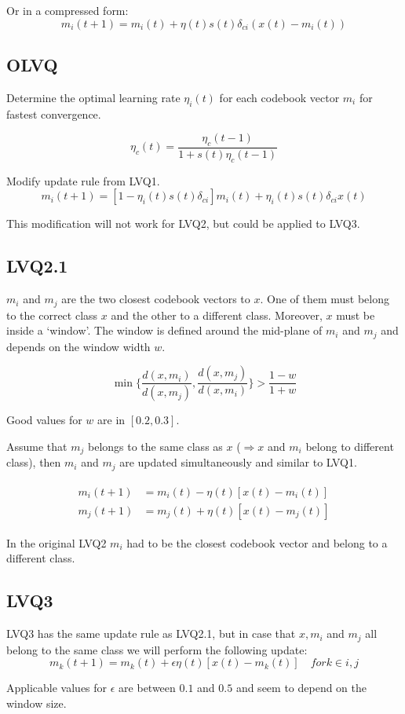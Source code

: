 Or in a compressed form:
\begin{equation}
m_i(t+1) = m_i(t) + \eta(t) s(t) \delta_{ci} (x(t) - m_i(t))
\end{equation}

\subsection{OLVQ}
Determine the optimal learning rate $\eta_i(t)$ for each codebook vector $m_i$ for fastest convergence.

\begin{equation}
\eta_c(t) = \frac{\eta_c(t-1)}{1 + s(t) \eta_c(t-1)}
\end{equation}

Modify update rule from LVQ1.
\begin{equation}
m_i(t+1) = [1 - \eta_i(t) s(t) \delta_{ci}] m_i(t) + \eta_i(t) s(t) \delta_{ci} x(t)
\end{equation}

This modification will not work for LVQ2, but could be applied to LVQ3.

\subsection{LVQ2.1}
$m_i$ and $m_j$ are the two closest codebook vectors to $x$. One of them must belong to the correct class $x$ and the other to a different class. Moreover, $x$ must be inside a `window'. The window is defined around the mid-plane of $m_i$ and $m_j$ and depends on the window width $w$.

\begin{equation}
\min\{ \frac{d(x, m_i)}{d(x, m_j)}, \frac{d(x, m_j)}{d(x, m_i)} \} > \frac{1-w}{1+w}
\end{equation}

Good values for $w$ are in $[0.2, 0.3]$.

Assume that $m_j$ belongs to the same class as $x$ ($\Rightarrow x$ and $m_i$ belong to different class), then $m_i$ and $m_j$ are updated simultaneously and similar to LVQ1.

\begin{align}
\begin{split}
m_i(t+1) &= m_i(t) - \eta(t) [x(t) - m_i(t)]\\
m_j(t+1) &= m_j(t) + \eta(t) [x(t) - m_j(t)]
\end{split}
\end{align}

In the original LVQ2 $m_i$ had to be the closest codebook vector and belong to a different class.

\subsection{LVQ3}
LVQ3 has the same update rule as LVQ2.1, but in case that $x, m_i$ and $m_j$ all belong to the same class we will perform the following update:
\begin{equation}
m_k(t+1) = m_k(t) + \epsilon \eta(t) [x(t) - m_k(t)] \quad for k \in {i, j}
\end{equation}

Applicable values for $\epsilon$ are between $0.1$ and $0.5$ and seem to depend on the window size.
